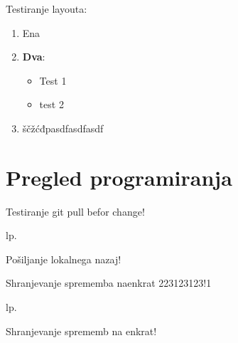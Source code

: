 
Testiranje layouta:

\begin{enumerate}
\item Ena
\item \textbf{Dva}:
  \begin{itemize}[style]
  \item Test 1
  \item test 2
  \end{itemize}
\item ščžćđpasdfasdfasdf
\end{enumerate}

\chapter{Pregled programiranja}
\label{chap:Pregled_programiranja}

Testiranje git pull befor change!

lp.

Pošiljanje lokalnega nazaj!


Shranjevanje sprememba naenkrat 223123123!1

lp.

Shranjevanje sprememb na enkrat!




